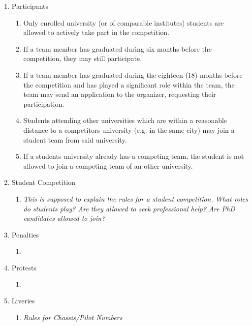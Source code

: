 \begin{enumerate}
    \item{Participants}
    \begin{enumerate}
      \item Only enrolled university (or of comparable institutes) students are allowed to actively take part in the competition.
      \item If a team member has graduated during six months before the competition, they may still participate.
      \item If a team member has graduated during the eighteen (18) months before the competition and has played a significant role within the team,
      the team may send an application to the organizer, requesting their participation. 
      \item Students attending other universities which are within a reasonable distance to a competitors university (e.g. in the same city) may join
      a student team from said university.
      \item If a students university already has a competing team, the student is not allowed to join a competing team of 
      an other university.  
    \end{enumerate}

    \item{Student Competition}
    \begin{enumerate}
      \item \emph{This is supposed to explain the rules for a student competition. What roles do students play? 
      Are they allowed to seek professional help? Are PhD candidates allowed to join?}
    \end{enumerate}

    \item{Penalties}
    \begin{enumerate}
      \item 
    \end{enumerate}

    \item{Protests}
    \begin{enumerate}
      \item 
    \end{enumerate}

    \item{Liveries}
    \begin{enumerate}
      \item \emph{Rules for Chassis/Pilot Numbers}
    \end{enumerate}


\end{enumerate}
